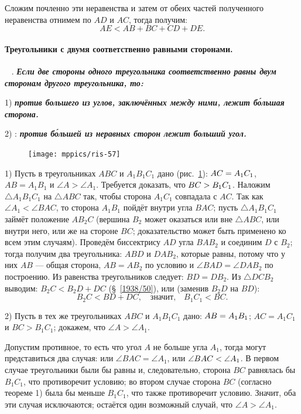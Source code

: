 \documentclass[oneside]{book}
\begin{document}
Сложим почленно эти неравенства и затем от обеих частей полученного неравенства отнимем по $AD$ и $AC$, тогда получим:
\[AE<AB+BC +CD + DE.\]

\paragraph{Треугольники с двумя соответственно равными сторонами.}\label{1938/52}\ 
\smallskip
{}.
\textbf{\emph{Если две стороны одного треугольника соответственно равны двум сторонам другого треугольника, то:}}

1) \textbf{\emph{против большего из углов, заключённых между ними, лежит б\'{о}льшая сторона.}}

2) :
\textbf{\emph{против б\'{о}льшей из неравных сторон лежит больший угол.}}

\begin{figure}[h!]
\centering
\texttt{[image: mppics/ris-57]}
\caption{}\label{1938/ris-57}
\end{figure}

1) Пусть в треугольниках $ABC$ и $A_1B_1C_1$ дано (рис.~\ref{1938/ris-57}):
$AC\z=A_1C_1$, $AB=A_1B_1$ и $\angle A > \angle A_1$.
Требуется доказать, что $BC\z>B_1C_1$.
Наложим $\triangle A_1B_1C_1$ на $\triangle ABC$ так, чтобы сторона $A_1C_1$ совпадала с $AC$.
Так как $\angle A_1 < \angle BAC$, то сторона $A_1B_1$ пойдёт внутри угла $BAC$;
пусть $\triangle A_1B_1C_1$ займёт положение $AB_2C$ (вершина $B_2$ может оказаться или вне $\triangle ABC$, или внутри него, или же на стороне $BC$;
доказательство может быть применено ко всем этим случаям).
Проведём биссектрису $AD$ угла $BAB_2$ и соединим $D$ с $B_2$;
тогда получим два треугольника:
$ABD$ и $DAB_2$, которые равны, потому что у них $AB$ — общая сторона, $AB=AB_2$ по условию и $\angle BAD=\angle DAB_2$ по построению.
Из равенства треугольников следует:
$BD=DB_2$.
Из $\triangle DCB_2$ выводим:
$B_2C < B_2D + DC$ (§~\ref{1938/50}), или (заменив $B_2D$ на $BD$):
\[B_2C <BD +DC,\quad\text{значит,}\quad B_1C_1 < BC.\]

2) Пусть в тех же треугольниках $ABC$ и $A_1B_1C_1$ дано:
$AB\z=A_1B_1$;
$AC=A_1C_1$ и $BC>B_1C_1$;
докажем, что $\angle A > \angle A_1$.

Допустим противное, то есть что угол $A$ не больше угла $A_1$, тогда могут представиться два случая:
или $\angle BAC = \angle A_1$, или $\angle BAC \z< \angle A_1$.
В первом случае треугольники были бы равны и, следовательно, сторона $BC$ равнялась бы $B_1C_1$, что противоречит условию;
во втором случае сторона $BC$ (согласно теореме 1) была бы меньше $B_1C_1$, что также противоречит условию.
Значит, оба эти случая исключаются;
остаётся один возможный случай, что $\angle A > \angle A_1$.
\end{document}
